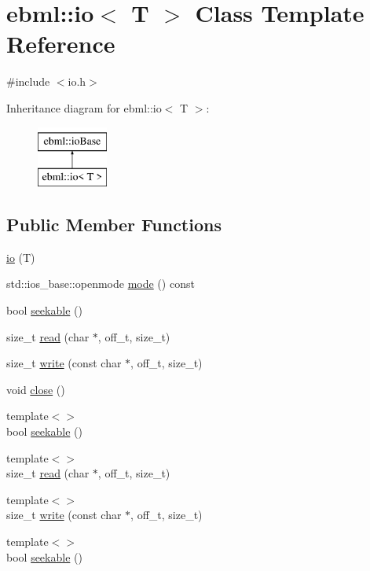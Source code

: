 \hypertarget{classebml_1_1io}{}\section{ebml\+:\+:io$<$ T $>$ Class Template Reference}
\label{classebml_1_1io}


{\ttfamily \#include $<$io.\+h$>$}

Inheritance diagram for ebml\+:\+:io$<$ T $>$\+:\begin{figure}[H]
\begin{center}
\leavevmode
\includegraphics[height=2.000000cm]{classebml_1_1io}
\end{center}
\end{figure}
\subsection*{Public Member Functions}
\begin{DoxyCompactItemize}
\item 
\mbox{\hyperlink{classebml_1_1io_acf15f9f08eb2e65c72363320aa8bc112}{io}} (T)
\item 
std\+::ios\+\_\+base\+::openmode \mbox{\hyperlink{classebml_1_1io_ab1143b5c835958387d95695151744d33}{mode}} () const
\item 
bool \mbox{\hyperlink{classebml_1_1io_ab019a4128b3339941124a12632c919fd}{seekable}} ()
\item 
size\+\_\+t \mbox{\hyperlink{classebml_1_1io_ad745dc2c29544750dcd38a21cba0a16c}{read}} (char $\ast$, off\+\_\+t, size\+\_\+t)
\item 
size\+\_\+t \mbox{\hyperlink{classebml_1_1io_a5c3f2df6edfbd090b4d0fbc8a6dacccb}{write}} (const char $\ast$, off\+\_\+t, size\+\_\+t)
\item 
void \mbox{\hyperlink{classebml_1_1io_a929714d05587d37d46bf8813b35c788d}{close}} ()
\item 
{\footnotesize template$<$$>$ }\\bool \mbox{\hyperlink{classebml_1_1io_a6e97c1e6868bf65286328b9447eaa419}{seekable}} ()
\item 
{\footnotesize template$<$$>$ }\\size\+\_\+t \mbox{\hyperlink{classebml_1_1io_a3b291aa8fb7bbeeb3f9d2ef152c37115}{read}} (char $\ast$, off\+\_\+t, size\+\_\+t)
\item 
{\footnotesize template$<$$>$ }\\size\+\_\+t \mbox{\hyperlink{classebml_1_1io_aedbdf5a69ee0ae64f909a59645cd0db7}{write}} (const char $\ast$, off\+\_\+t, size\+\_\+t)
\item 
{\footnotesize template$<$$>$ }\\bool \mbox{\hyperlink{classebml_1_1io_a4ea6caf18c5646646b3a15bc3c59a5ab}{seekable}} ()
\end{DoxyCompactItemize}
